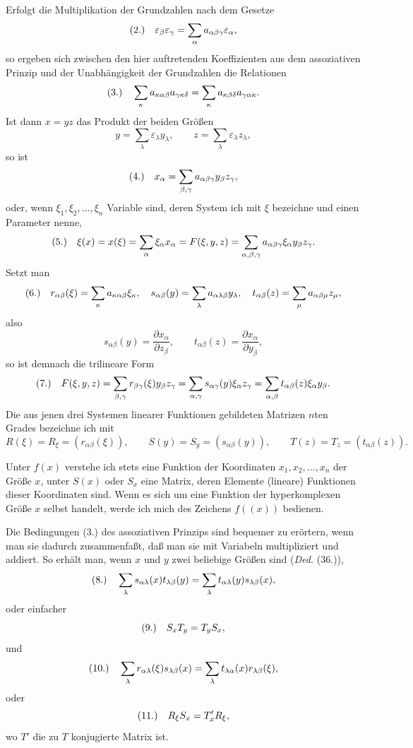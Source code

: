 \documentclass[11pt]{article}
\newcommand{\eps}{\varepsilon}
\newcommand{\fnum}[1]{\textup{(\ensuremath{#1}.)}\quad}
\begin{document}
Erfolgt die Multiplikation der Grundzahlen nach dem Gesetze
\[
\fnum{2} \eps_\beta\eps_\gamma=\sum_\alpha a_{\alpha\beta\gamma}\eps_\alpha,
\]
so ergeben sich zwischen den hier auftretenden Koeffizienten aus dem assoziativen Prinzip und der Unabhängigkeit der Grundzahlen die Relationen
\[
\fnum{3} \sum_\kappa a_{\kappa\alpha\beta}a_{\gamma\kappa\delta}
      =\sum_\kappa a_{\kappa\beta\delta}a_{\gamma\alpha\kappa}.
\]
Ist dann $x=yz$ das Produkt der beiden Größen
\[
 y=\sum_\lambda\eps_\lambda y_\lambda,\qquad
 z=\sum_\lambda\eps_\lambda z_\lambda,
\]
so ist
\[
\fnum{4} x_\alpha=\sum_{\beta,\gamma}a_{\alpha\beta\gamma}y_\beta z_\gamma,
\]
oder, wenn $\xi_1,\xi_2,\ldots,\xi_n$ Variable sind, deren System ich mit $\xi$ bezeichne und einen Parameter nenne,
\[
\fnum{5} \xi(x)=x(\xi)=\sum_\alpha \xi_\alpha x_\alpha
  =F(\xi,y,z)=\sum_{\alpha,\beta,\gamma}a_{\alpha\beta\gamma}\xi_\alpha y_\beta z_\gamma.
\]
Setzt man
\[
\fnum{6} r_{\alpha\beta}(\xi)=\sum_\kappa a_{\kappa\alpha\beta}\xi_\kappa,\quad
s_{\alpha\beta}(y)=\sum_\lambda a_{\alpha\lambda\beta}y_\lambda,\quad
t_{\alpha\beta}(z)=\sum_\mu a_{\alpha\beta\mu}z_\mu,
\]
also
\[
s_{\alpha\beta}(y)=\frac{\partial x_\alpha}{\partial z_\beta},\qquad
t_{\alpha\beta}(z)=\frac{\partial x_\alpha}{\partial y_\beta},
\]
so ist demnach die trilineare Form
\[
\fnum{7} F(\xi,y,z)=\sum_{\beta,\gamma}r_{\beta\gamma}(\xi)y_\beta z_\gamma
=\sum_{\alpha,\gamma}s_{\alpha\gamma}(y)\xi_\alpha z_\gamma
=\sum_{\alpha,\beta}t_{\alpha\beta}(z)\xi_\alpha y_\beta .
\]
Die aus jenen drei Systemen linearer Funktionen gebildeten Matrizen $n$ten Grades bezeichne ich mit
\[
 R(\xi)=R_\xi=(r_{\alpha\beta}(\xi)),\qquad
 S(y)=S_y=(s_{\alpha\beta}(y)),\qquad
 T(z)=T_z=(t_{\alpha\beta}(z)).
\]

Unter $f(x)$ verstehe ich stets eine Funktion der Koordinaten $x_1,x_2,\ldots,x_n$ der Größe $x$, unter $S(x)$ oder $S_x$ eine Matrix, deren Elemente (lineare) Funktionen dieser Koordinaten sind. Wenn es sich um eine Funktion der hyperkomplexen Größe $x$ selbst handelt, werde ich mich des Zeichens $f((x))$ bedienen.

Die Bedingungen (3.) des assoziativen Prinzips sind bequemer zu erörtern, wenn man sie dadurch zusammenfaßt, daß man sie mit Variabeln multipliziert und addiert. So erhält man, wenn $x$ und $y$ zwei beliebige Größen sind (\emph{Ded.} (36.)),
\[
\fnum{8} \sum_\lambda s_{\alpha\lambda}(x)t_{\lambda\beta}(y)
      =\sum_\lambda t_{\alpha\lambda}(y)s_{\lambda\beta}(x),
\]
oder einfacher
\[
\fnum{9} S_xT_y=T_yS_x,
\]
und
\[
\fnum{10} \sum_\lambda r_{\alpha\lambda}(\xi)s_{\lambda\beta}(x)
       =\sum_\lambda t_{\lambda\alpha}(x)r_{\lambda\beta}(\xi),
\]
oder
\[
\fnum{11} R_\xi S_x=T'_xR_\xi,
\]
wo $T'$ die zu $T$ konjugierte Matrix ist.
\end{document}
